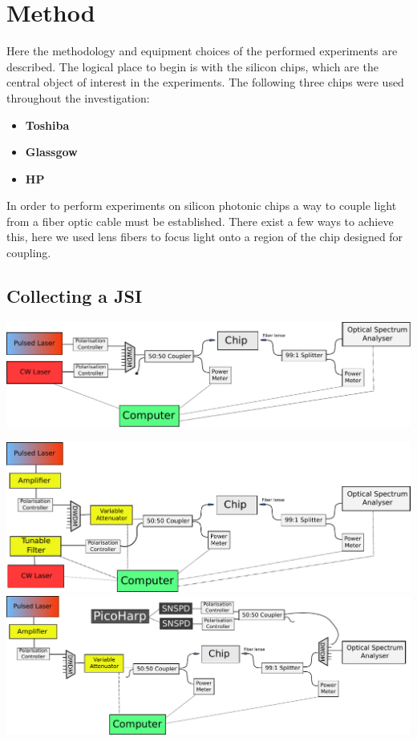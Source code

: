 \section{Method}
Here the methodology and equipment choices of the performed experiments are described. The logical place to begin is with the silicon chips, which are the central object of interest in the experiments. The following three chips were used throughout the investigation:
\begin{itemize}
	\item {\bf Toshiba } 
	\item {\bf Glassgow }
	\item {\bf HP }
\end{itemize}


In order to perform experiments on silicon photonic chips a way to couple light from a fiber optic cable must be established. There exist a few ways to achieve this, here we used lens fibers to focus light onto a region of the chip designed for coupling. 
\subsection{Collecting a JSI}
\begingroup
    \centering  
    \includegraphics[width=18cm]{img/method/setup_1.pdf}
     \vspace{3pt} \label{crossCompare}
\endgroup

\begingroup
    \centering  
    \includegraphics[width=18cm]{img/method/setup_2.pdf}
     \vspace{3pt} \label{crossCompare}
\endgroup
\begingroup
    \centering  
    \includegraphics[width=18cm]{img/method/setup_3.pdf}
     \vspace{3pt} \label{crossCompare}
\endgroup

